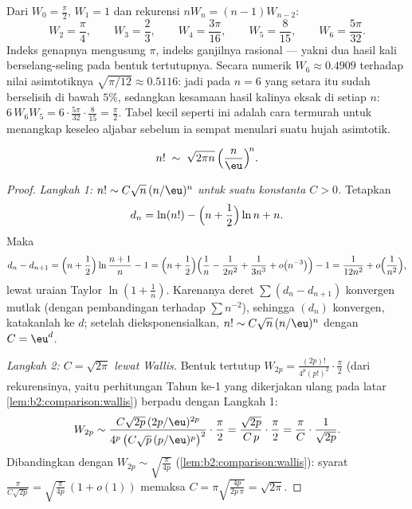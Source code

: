 \begin{example}\label{ex:b2:comparison:wallisvalues}
Dari $W_0 = \frac\pi2$, $W_1 = 1$ dan rekurensi $nW_n =
(n-1)W_{n-2}$:
\[
W_2 = \frac\pi4, \qquad
W_3 = \frac23, \qquad
W_4 = \frac{3\pi}{16}, \qquad
W_5 = \frac{8}{15}, \qquad
W_6 = \frac{5\pi}{32}.
\]
Indeks genapnya mengusung $\pi$, indeks ganjilnya rasional --- yakni dua
hasil kali berselang-seling pada bentuk tertutupnya. Secara numerik $W_6
\approx 0.4909$ terhadap nilai asimtotiknya
$\sqrt{\pi/12} \approx 0.5116$: jadi pada $n = 6$ yang setara itu
sudah berselisih di bawah $5\%$, sedangkan kesamaan hasil kalinya eksak
di setiap $n$: $6\,W_6W_5 = 6\cdot\frac{5\pi}{32}\cdot\frac8{15} =
\frac\pi2$. Tabel kecil seperti ini adalah cara termurah untuk
menangkap keseleo aljabar sebelum ia sempat menulari suatu hujah asimtotik.
\end{example}

\begin{theorem}[Stirling]\label{thm:b2:comparison:stirling}
\[
n! \;\sim\; \sqrt{2\pi n}\, \Bigl(\frac{n}{\eu}\Bigr)^{\!n}
.\index{rumus Stirling}
\]
\end{theorem}

\begin{proof}
\emph{Langkah 1: $n! \sim C \sqrt n\, (n/\eu)^n$ untuk suatu konstanta $C
> 0$.} Tetapkan
\[
d_n = \ln(n!) - \Bigl(n + \frac12\Bigr)\ln n + n .
\]
Maka
\[
d_n - d_{n+1}
= \Bigl(n + \frac12\Bigr) \ln\frac{n+1}{n} - 1
= \Bigl(n + \frac12\Bigr)\Bigl(\frac1n - \frac{1}{2n^2} +
\frac{1}{3n^3} + o\bigl(n^{-3}\bigr)\Bigr) - 1
= \frac{1}{12n^2} + o\Bigl(\frac{1}{n^2}\Bigr),
\]
lewat uraian Taylor $\ln(1 + \frac1n)$. Karenanya deret $\sum (d_n
- d_{n+1})$ konvergen mutlak (dengan pembandingan terhadap $\sum
n^{-2}$), sehingga $(d_n)$ konvergen, katakanlah ke $d$; setelah
dieksponensialkan, $n! \sim C\sqrt n\,(n/\eu)^n$ dengan $C = \eu^{d}$.

\emph{Langkah 2: $C = \sqrt{2\pi}$ lewat Wallis.} Bentuk tertutup
$W_{2p} = \frac{(2p)!}{4^p (p!)^2}\cdot\frac\pi2$ (dari rekurensinya,
yaitu perhitungan Tahun ke-1 yang dikerjakan ulang pada latar
\cref{lem:b2:comparison:wallis}) berpadu dengan Langkah 1:
\[
W_{2p} \sim \frac{C\sqrt{2p}\,(2p/\eu)^{2p}}
{4^p\,\bigl(C\sqrt p\,(p/\eu)^p\bigr)^2}\cdot\frac{\pi}{2}
= \frac{\sqrt{2p}}{C\,p}\cdot\frac{\pi}{2}
= \frac{\pi}{C}\cdot\frac{1}{\sqrt{2p}} .
\]
Dibandingkan dengan $W_{2p} \sim \sqrt{\frac{\pi}{4p}}$
(\cref{lem:b2:comparison:wallis}): syarat $\frac{\pi}{C\sqrt{2p}} =
\sqrt{\frac{\pi}{4p}}\,(1 + o(1))$ memaksa $C = \pi
\sqrt{\frac{4p}{2p\,\pi}} = \sqrt{2\pi}$.
\end{proof}

